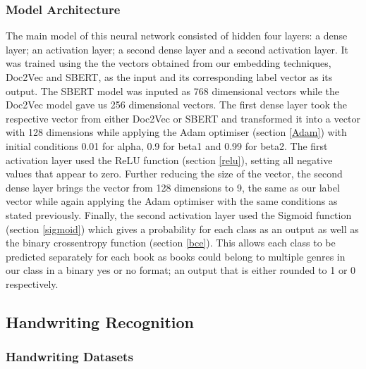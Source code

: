 \documentclass[twocolumn,pra,floatfix]{revtex4-2}
\begin{document}
            \subsubsection{Model Architecture}
    
                The main model of this neural network consisted of hidden four layers: a dense layer; an activation layer; a second dense layer and a second activation layer. It was trained using the the vectors obtained from our embedding techniques, Doc2Vec and SBERT, as the input and its corresponding label vector as its output. The SBERT model was inputed as 768 dimensional vectors while the Doc2Vec model gave us 256 dimensional vectors. The first dense layer took the respective vector from either Doc2Vec or SBERT and transformed it into a vector with 128 dimensions while applying the Adam optimiser (section \ref{Adam}) with initial conditions 0.01 for alpha, 0.9 for beta1 and 0.99 for beta2. The first activation layer used the ReLU function (section \ref{relu}), setting all negative values that appear to zero. Further reducing the size of the vector, the second dense layer brings the vector from 128 dimensions to 9, the same as our label vector while again applying the Adam optimiser with the same conditions as stated previously. Finally, the second activation layer used the Sigmoid function (section \ref{sigmoid}) which gives a probability for each class as an output as well as the binary crossentropy function (section \ref{bce}). This allows each class to be predicted separately for each book as books could belong to multiple genres in our class in a binary yes or no format; an output that is either rounded to 1 or 0 respectively.

        \subsection{Handwriting Recognition}
        
            \subsubsection{Handwriting Datasets}
    
\end{document}
